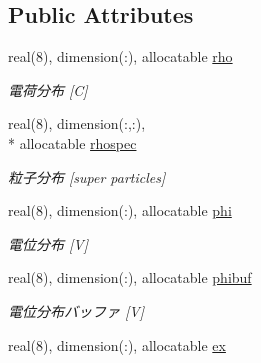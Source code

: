 \subsection*{Public Attributes}
\begin{DoxyCompactItemize}
\item 
\hypertarget{classcommons_a1b3b0855f6ad5c57325248df30de70e8}{real(8), dimension(\-:), allocatable \hyperlink{classcommons_a1b3b0855f6ad5c57325248df30de70e8}{rho}}\label{classcommons_a1b3b0855f6ad5c57325248df30de70e8}

\begin{DoxyCompactList}\small\item\em 電荷分布 \mbox{[}C\mbox{]} \end{DoxyCompactList}\item 
\hypertarget{classcommons_a70dbeb61a507764b05e647f58595f43a}{real(8), dimension(\-:,\-:), \\*
allocatable \hyperlink{classcommons_a70dbeb61a507764b05e647f58595f43a}{rhospec}}\label{classcommons_a70dbeb61a507764b05e647f58595f43a}

\begin{DoxyCompactList}\small\item\em 粒子分布 \mbox{[}super particles\mbox{]} \end{DoxyCompactList}\item 
\hypertarget{classcommons_a686e5290d30b71e9ed96b95fd46c5ce4}{real(8), dimension(\-:), allocatable \hyperlink{classcommons_a686e5290d30b71e9ed96b95fd46c5ce4}{phi}}\label{classcommons_a686e5290d30b71e9ed96b95fd46c5ce4}

\begin{DoxyCompactList}\small\item\em 電位分布 \mbox{[}V\mbox{]} \end{DoxyCompactList}\item 
\hypertarget{classcommons_a5861ed61df1440a1d38b033a0895cefd}{real(8), dimension(\-:), allocatable \hyperlink{classcommons_a5861ed61df1440a1d38b033a0895cefd}{phibuf}}\label{classcommons_a5861ed61df1440a1d38b033a0895cefd}

\begin{DoxyCompactList}\small\item\em 電位分布バッファ \mbox{[}V\mbox{]} \end{DoxyCompactList}\item 
\hypertarget{classcommons_a6151aa63046fce2f401640eca951369f}{real(8), dimension(\-:), allocatable \hyperlink{classcommons_a6151aa63046fce2f401640eca951369f}{ex}}\label{classcommons_a6151aa63046fce2f401640eca951369f}


\end{DoxyCompactItemize}
